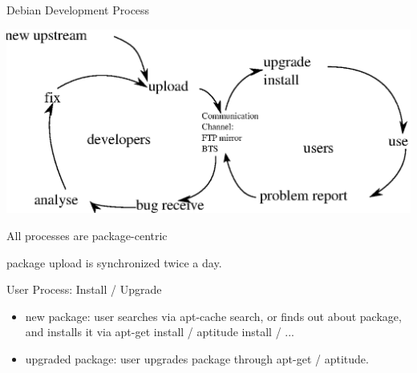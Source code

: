 \documentclass[cjk,dvipdfm,12pt]{beamer}
\begin{document}
\begin{frame}{Debian Development Process}

\includegraphics[width=1\hsize]{image200805/develcycle.eps} 

All processes are package-centric

package upload is synchronized twice a day.

\end{frame}

\begin{frame}{User Process: Install / Upgrade}
 \begin{itemize}
  \item new package: 
	user searches via apt-cache search, or finds out about package,
	and installs it via apt-get install / aptitude install / ...
  \item upgraded package:
	user upgrades package through 
	apt-get  / aptitude.	
 \end{itemize}
\end{frame}
\end{document}
